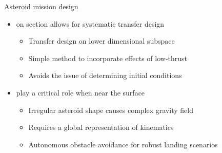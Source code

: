 \begin{frame}[t]{Asteroid mission design} %
  \begin{itemize}
      \item {} on \Poincare section allows for systematic transfer design
        \begin{itemize}
            \item Transfer design on lower dimensional subspace
            \item Simple method to incorporate effects of low-thrust 
            \item Avoids the issue of determining initial conditions
        \end{itemize}
        \pause
       \item {} play a critical role when near the surface
       \begin{itemize}
            \item Irregular asteroid shape causes complex gravity field
            \item Requires a global representation of kinematics 
            \item Autonomous obstacle avoidance for robust landing scenarios 
        \end{itemize}
  \end{itemize}

\end{frame} %
